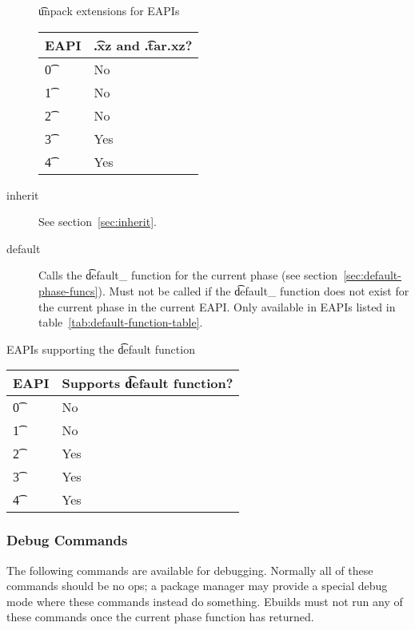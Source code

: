 \begin{description}
\begin{centertable}{\t{unpack} extensions for EAPIs} \label{tab:unpack-extensions-table}
    \begin{tabular}{ l l }
        \toprule
            \multicolumn{1}{c}{\textbf{EAPI}} &
            \multicolumn{1}{c}{\textbf{\t{.xz} and \t{.tar.xz}?}} \\
            \midrule
    \t{0} & No \\
    \t{1} & No \\
    \t{2} & No \\
    \t{3} & Yes \\
    \t{4} & Yes \\
    \bottomrule
    \end{tabular}
\end{centertable}

\item[inherit] See section~\ref{sec:inherit}.

\item[default]
     Calls the \t{default\_} function for the current phase (see
    section~\ref{sec:default-phase-funcs}).  Must not be called if the \t{default\_} function
    does not exist for the current phase in the current EAPI.  Only available in EAPIs listed in
    table~\ref{tab:default-function-table}.
\end{description}

\begin{centertable}{EAPIs supporting the \t{default} function} \label{tab:default-function-table}
    \begin{tabular}{ l l }
        \toprule
            \multicolumn{1}{c}{\textbf{EAPI}} &
            \multicolumn{1}{c}{\textbf{Supports \t{default} function?}} \\
            \midrule
    \t{0} & No \\
    \t{1} & No \\
    \t{2} & Yes \\
    \t{3} & Yes \\
    \t{4} & Yes \\
    \bottomrule
    \end{tabular}
\end{centertable}

\subsubsection{Debug Commands}
The following commands are available for debugging. Normally all of these commands should be no ops;
a package manager may provide a special debug mode where these commands instead do something.
Ebuilds must not run any of these commands once the current phase function has returned.

